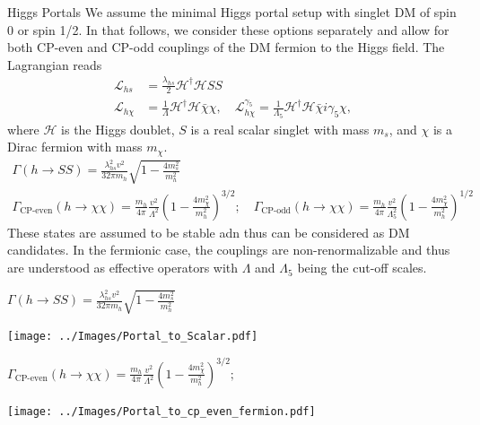 \documentclass{../../bredelebeamer}
\begin{document}
\begin{frame}{Higgs Portals}
    We assume the minimal Higgs portal setup with singlet DM of spin 0 or spin 1/2. In that follows, we consider these options separately and allow for both CP-even and CP-odd couplings of the DM fermion to the Higgs field. The Lagrangian reads
    $$
        \begin{aligned}
        \mathcal{L}_{h s} & =\frac{\lambda_{h s}}{2} \mathcal{H}^{\dagger} \mathcal{H} S S \\
        \mathcal{L}_{h \chi} & =\frac{1}{\Lambda} \mathcal{H}^{\dagger} \mathcal{H} \bar{\chi} \chi, \quad \mathcal{L}_{h \chi}^{\gamma_5}=\frac{1}{\Lambda_5} \mathcal{H}^{\dagger} \mathcal{H} \bar{\chi} i \gamma_5 \chi,
        \end{aligned}
    $$
    where $\mathcal{H}$ is the Higgs doublet, $S$ is a real scalar singlet with mass $m_s$, and $\chi$ is a Dirac fermion with mass $m_\chi$. 
    \begin{gather*}
        \Gamma(h \rightarrow S S)=\frac{\lambda_{h s}^2 v^2}{32 \pi m_h} \sqrt{1-\frac{4 m_s^2}{m_h^2}} \\
        \Gamma_{\text{CP-even}}(h \rightarrow \chi \chi)=\frac{m_h}{4 \pi} \frac{v^2}{\Lambda^2}\left(1-\frac{4 m_\chi^2}{m_h^2}\right)^{3 / 2}; \quad 
        \Gamma_{\text{CP-odd}}(h \rightarrow \chi \chi)=\frac{m_h}{4 \pi} \frac{v^2}{\Lambda_5^2}\left(1-\frac{4 m_\chi^2}{m_h^2}\right)^{1 / 2}
    \end{gather*}
    These states are assumed to be stable adn thus can be considered as DM candidates. In the fermionic case, the couplings are non-renormalizable and thus are understood as effective operators with $\Lambda$ and $\Lambda_5$ being the cut-off scales. 
\end{frame}

\begin{frame}{$\Gamma(h \rightarrow S S)=\frac{\lambda_{h s}^2 v^2}{32 \pi m_h} \sqrt{1-\frac{4 m_s^2}{m_h^2}}$}
    \begin{center}
        \texttt{[image: ../Images/Portal\_to\_Scalar.pdf]}
    \end{center}
\end{frame}
\begin{frame}{$\Gamma_{\text{CP-even}}(h \rightarrow \chi \chi)=\frac{m_h}{4 \pi} \frac{v^2}{\Lambda^2}\left(1-\frac{4 m_\chi^2}{m_h^2}\right)^{3 / 2}; $}
    \begin{center}
        \texttt{[image: ../Images/Portal\_to\_cp\_even\_fermion.pdf]}
    \end{center}
\end{frame}
\end{document}
